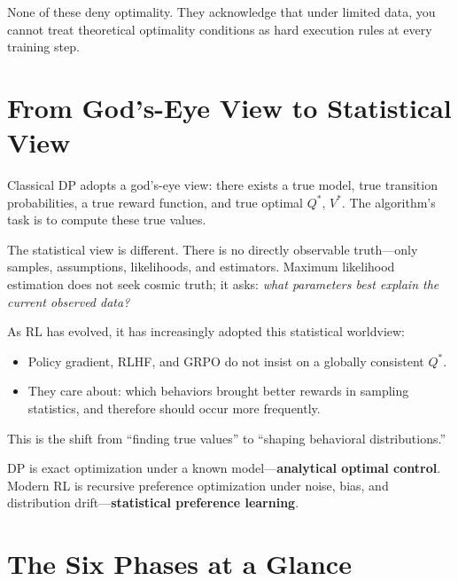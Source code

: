 None of these deny optimality.
They acknowledge that under limited data, you cannot treat theoretical optimality conditions as hard execution rules at every training step.

\section{From God's-Eye View to Statistical View}
\label{sec:god-to-stat}

Classical DP adopts a god's-eye view: there exists a true model, true transition probabilities, a true reward function, and true optimal $Q^{\ast}$, $V^{\ast}$.
The algorithm's task is to compute these true values.

The statistical view is different.
There is no directly observable truth---only samples, assumptions, likelihoods, and estimators.
Maximum likelihood estimation does not seek cosmic truth; it asks:
\emph{what parameters best explain the current observed data?}

As RL has evolved, it has increasingly adopted this statistical worldview:
\begin{itemize}
    \item Policy gradient, RLHF, and GRPO do not insist on a globally consistent $Q^{\ast}$.
    \item They care about: which behaviors brought better rewards in sampling statistics, and therefore should occur more frequently.
\end{itemize}

This is the shift from ``finding true values'' to ``shaping behavioral distributions.''

\begin{keyidea}
DP is exact optimization under a known model---\textbf{analytical optimal control}.\\
Modern RL is recursive preference optimization under noise, bias, and distribution drift---\textbf{statistical preference learning}.
\end{keyidea}

\section{The Six Phases at a Glance}
\label{sec:six-phases}

